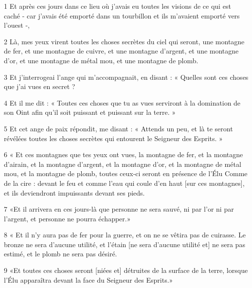 
\par 1 Et après ces jours dans ce lieu où j'avais eu toutes les visions de ce qui est caché - car j'avais été emporté dans un tourbillon et ils m'avaient emporté vers l'ouest -,
\par 2 Là, mes yeux virent toutes les choses secrètes du ciel qui seront, une montagne de fer, et une montagne de cuivre, et une montagne d'argent, et une montagne d'or, et une montagne de métal mou, et une montagne de plomb.
\par 3 Et j'interrogeai l'ange qui m'accompagnait, en disant : « Quelles sont ces choses que j'ai vues en secret ?
\par 4 Et il me dit : « Toutes ces choses que tu as vues serviront à la domination de son Oint afin qu'il soit puissant et puissant sur la terre. »
\par 5 Et cet ange de paix répondit, me disant : « Attends un peu, et là te seront révélées toutes les choses secrètes qui entourent le Seigneur des Esprits. »
\par 6 « Et ces montagnes que tes yeux ont vues, la montagne de fer, et la montagne d'airain, et la montagne d'argent, et la montagne d'or, et la montagne de métal mou, et la montagne de plomb, toutes ceux-ci seront en présence de l'Élu Comme de la cire : devant le feu et comme l'eau qui coule d'en haut [sur ces montagnes], et ils deviendront impuissants devant ses pieds.
\par 7 «Et il arrivera en ces jours-là que personne ne sera sauvé, ni par l'or ni par l'argent, et personne ne pourra échapper.»
\par 8 « Et il n'y aura pas de fer pour la guerre, et on ne se vêtira pas de cuirasse. Le bronze ne sera d'aucune utilité, et l'étain [ne sera d'aucune utilité et] ne sera pas estimé, et le plomb ne sera pas désiré.
\par 9 «Et toutes ces choses seront [niées et] détruites de la surface de la terre, lorsque l'Élu apparaîtra devant la face du Seigneur des Esprits.»


